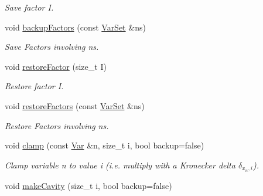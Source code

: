 \begin{CompactItemize}
\begin{CompactList}\small\item\em Save factor I. \item\end{CompactList}\item 
\hypertarget{classdai_1_1DAIAlg_0176904d3b4b9d083288ea8c4a2dc8bc}{
void \hyperlink{classdai_1_1DAIAlg_0176904d3b4b9d083288ea8c4a2dc8bc}{backupFactors} (const \hyperlink{classdai_1_1VarSet}{VarSet} \&ns)}
\label{classdai_1_1DAIAlg_0176904d3b4b9d083288ea8c4a2dc8bc}

\begin{CompactList}\small\item\em Save Factors involving ns. \item\end{CompactList}\item 
\hypertarget{classdai_1_1DAIAlg_bf8dbd2797ec871e86566a6dfc0864e3}{
void \hyperlink{classdai_1_1DAIAlg_bf8dbd2797ec871e86566a6dfc0864e3}{restoreFactor} (size\_\-t I)}
\label{classdai_1_1DAIAlg_bf8dbd2797ec871e86566a6dfc0864e3}

\begin{CompactList}\small\item\em Restore factor I. \item\end{CompactList}\item 
\hypertarget{classdai_1_1DAIAlg_3ce97e9370f1cdc785526c1a6c1eaadf}{
void \hyperlink{classdai_1_1DAIAlg_3ce97e9370f1cdc785526c1a6c1eaadf}{restoreFactors} (const \hyperlink{classdai_1_1VarSet}{VarSet} \&ns)}
\label{classdai_1_1DAIAlg_3ce97e9370f1cdc785526c1a6c1eaadf}

\begin{CompactList}\small\item\em Restore Factors involving ns. \item\end{CompactList}\item 
\hypertarget{classdai_1_1DAIAlg_b7d537f1a9d116617d8dce722ce65dc0}{
void \hyperlink{classdai_1_1DAIAlg_b7d537f1a9d116617d8dce722ce65dc0}{clamp} (const \hyperlink{classdai_1_1Var}{Var} \&n, size\_\-t i, bool backup=false)}
\label{classdai_1_1DAIAlg_b7d537f1a9d116617d8dce722ce65dc0}

\begin{CompactList}\small\item\em Clamp variable n to value i (i.e. multiply with a Kronecker delta $\delta_{x_n, i}$). \item\end{CompactList}\item 
\hypertarget{classdai_1_1DAIAlg_7f0b8452352080a1e35ab9a68cb589fd}{
void \hyperlink{classdai_1_1DAIAlg_7f0b8452352080a1e35ab9a68cb589fd}{makeCavity} (size\_\-t i, bool backup=false)}
\label{classdai_1_1DAIAlg_7f0b8452352080a1e35ab9a68cb589fd}


\end{CompactItemize}
